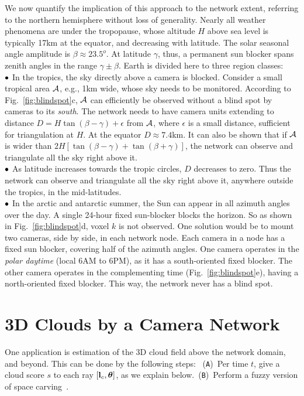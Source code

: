 \documentclass[runningheads]{llncs}
\begin{document}
We now quantify the implication of this approach to the network extent, referring to the northern hemisphere without loss of generality.
Nearly all weather phenomena are under the tropopause, whose altitude $H$ above sea level is typically 17km at the equator, and decreasing with latitude. The solar seasonal angle amplitude is $\beta\approx23.5^o$. At latitude $\gamma$, thus, a permanent sun blocker spans zenith angles in the range $\gamma\pm\beta$. Earth is divided here to three region classes:\\
  ${\bf \bullet}$ In the tropics, the sky directly above a camera is blocked. Consider
  a small tropical area ${\cal A}$, e.g., 1km wide, whose sky needs to be monitored. According to Fig.~\ref{fig:blindspot}c, ${\cal A}$ can efficiently be observed without
  a blind spot by cameras to its {\em south}. The network needs to have camera units extending to distance  $D=H\tan(\beta-\gamma)+\epsilon$ from ${\cal A}$, where $\epsilon$ is a small distance, sufficient for triangulation at $H$. At the equator $D\approx7.4$km.
  It can also be shown that if ${\cal A}$ is wider than $2H[\tan(\beta-\gamma)+\tan(\beta+\gamma)]$, the network can observe and triangulate all the sky right above it.\\
${\bf \bullet}$  As latitude increases towards the tropic circles, $D$ decreases to zero. Thus the network can observe and triangulate all the sky right above it, anywhere outside the tropics, in the mid-latitudes.\\
  ${\bf \bullet}$ In the arctic and antarctic summer, the Sun can appear in all azimuth angles over the day. A single 24-hour fixed sun-blocker blocks the horizon. So as shown in Fig.~\ref{fig:blindspot}d, voxel $k$ is not observed. One solution would be to mount two cameras, side by side, in each network node. Each camera in a node has a fixed sun blocker, covering half of the azimuth angles. One camera operates in the {\em polar daytime} (local 6AM to 6PM), as it has a south-oriented fixed blocker. The other camera operates in the complementing time (Fig.~\ref{fig:blindspot}e), having a north-oriented fixed blocker. This way, the network never has a blind spot.


\section{3D Clouds by a Camera Network}
\label{sec:3Dc}

One application is estimation of the 3D cloud field above the network domain, and beyond. This can be done by the following steps:~ 
({\tt A})~Per time $t$, give a {\rm cloud score} $s$  to each ray $[{\bf l}_c,{\bm \theta}]$, as we explain below.~({\tt B})~Perform a fuzzy version of space carving~\cite{Kutulakos2000,Ihrke2004}.
\end{document}
